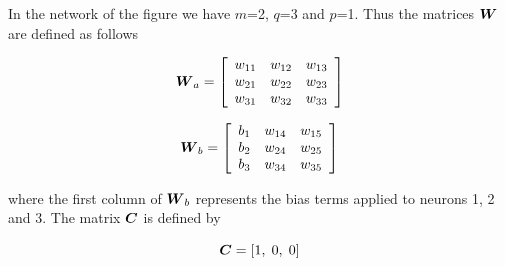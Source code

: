 \begin{enumerate}
\begin{solution}
    In the network of the figure we have $m$=2, $q$=3 and $p$=1. Thus the
    matrices $\boldsymbol{W}$ are defined as follows

    \[
    \boldsymbol{W}_a = 
    \left[\begin{array}{ccc}
        w_{11} & w_{12} & w_{13} \\
        w_{21} & w_{22} & w_{23} \\
        w_{31} & w_{32} & w_{33} \\
      \end{array}\right]
    \]

    \[
    \boldsymbol{W}_b = 
    \left[\begin{array}{ccc}
        b_{1} & w_{14} & w_{15} \\
        b_{2} & w_{24} & w_{25} \\
        b_{3} & w_{34} & w_{35} \\
      \end{array}\right]
    \]

    where the first column of $\boldsymbol{W}_b$ represents the bias terms applied to
    neurons 1, 2 and 3. The matrix $\boldsymbol{C}$ is defined by

    \[
    \boldsymbol{C} = [1, \; 0, \; 0]
    \]

  \end{solution}

\end{enumerate}

